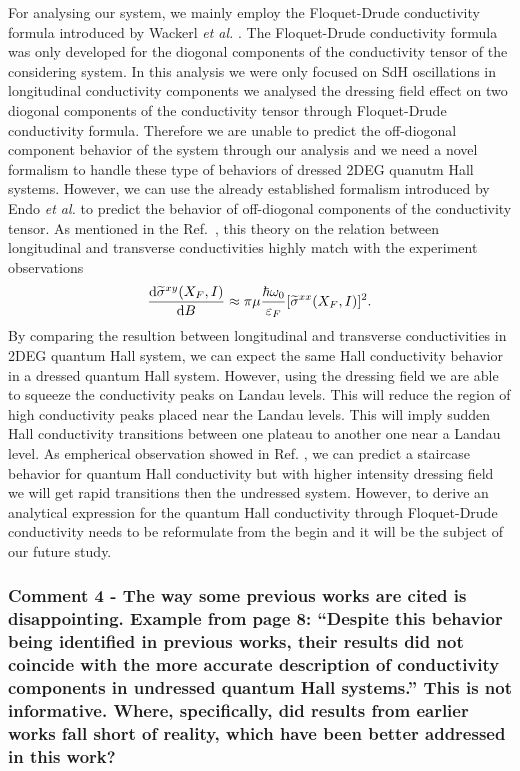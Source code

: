 \documentclass{article}
\begin{document}
For analysing our system, we mainly employ the Floquet-Drude conductivity formula introduced by Wackerl \textit{et al.} \cite{wackerl20}. The Floquet-Drude conductivity formula was only developed for the diogonal components of the conductivity tensor of the considering system. In this analysis we were only focused on SdH oscillations in longitudinal conductivity components we analysed the dressing field effect on two diogonal components of the conductivity tensor through Floquet-Drude conductivity formula. Therefore we are unable to predict the off-diogonal component behavior of the system through our analysis and we need a novel formalism to handle these type of behaviors of dressed 2DEG quanutm Hall systems. However, we can use the already established formalism introduced by Endo \textit{et al.} \cite{endo09} to predict the behavior of off-diogonal components of the conductivity tensor. As mentioned in the Ref.~\cite{endo09}, this theory on the relation between longitudinal and transverse conductivities highly match with the experiment observations
\begin{equation} \nonumber
  \dv{\widetilde{\sigma}^{xy}(X_F,I)}{B} \approx
    \pi\mu \frac{\hbar \omega_0}{\varepsilon_F} [\widetilde{\sigma}^{xx}(X_F,I)]^2.
\end{equation}
By comparing the resultion between longitudinal and transverse conductivities in 2DEG quantum Hall system, we can expect the same Hall conductivity behavior in a dressed quantum Hall system. However, using the dressing field we are able to squeeze the conductivity peaks on Landau levels. This will reduce the region of high conductivity peaks placed near the Landau levels. This will imply sudden Hall conductivity transitions between one plateau to another one near a Landau level. As empherical observation showed in Ref. \cite{klitzing80,gusynin06}, we can predict a staircase behavior for quantum Hall conductivity but with higher intensity dressing field we will get rapid transitions then the undressed system. However, to derive an analytical expression for the quantum Hall conductivity through Floquet-Drude conductivity needs to be reformulate from the begin and it will be the subject of our future study.

\subsubsection*{Comment 4 -
\color{RoyalBlue} The way some previous works are cited is disappointing. Example from page 8: “Despite this behavior being identified in previous works, their results did not coincide with the more accurate description of conductivity components in undressed quantum Hall systems.” This is not informative. Where, specifically, did results from earlier works fall short of reality, which have been better addressed in this work?
}
\end{document}
